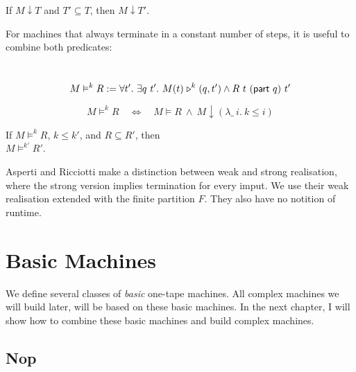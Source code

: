 \begin{lemma}
  \label{lem:TerminatesIn_monotone}
  If $M \downarrow T$ and $T' \subseteq T$, then $M \downarrow T'$.
\end{lemma}


For machines that always terminate in a constant number of steps, it is useful to combine both predicates:
\begin{definition}
  \label{def:RealiseIn}
  ~
  \[
    M \vDash^k R :=
    \forall t'.~
    \exists q~t'.~
    M(t) \mathrel{\triangleright}^k(q, t') \land R~t~(\textsf{part}~q)~t'
  \]
\end{definition}

\begin{lemma}
  \label{lem:Realise_total}
  \[
    M \vDash^k R
    \quad\iff\quad
    M \vDash R ~\land~
    M \downarrow (\lambda \_~i.~k \le i)
  \]
\end{lemma}

\begin{lemma}
  \label{lem:Realise_monotone}
  If $M \vDash^k R$, $k \leq k'$, and $R \subseteq R'$, then \\
  $M \vDash^{k'} R'$.
\end{lemma}

Asperti and Ricciotti \cite{asperti2015} make a distinction between weak and strong realisation, where the strong version implies termination for
every imput.  We use their weak realisation extended with the finite partition $F$.  They also have no notition of runtime.


\section{Basic Machines}
\label{sec:basic_machines}


We define several classes of \emph{basic} one-tape machines.  All complex machines we will build later, will be based on these basic machines.  In the
next chapter, I will show how to combine these basic machines and build complex machines.


\subsection{Nop}
\label{sec:basic_machines-Nop}

